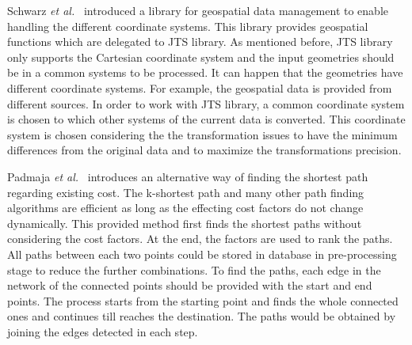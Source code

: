 \documentclass[a4paper,12pt]{article}
\begin{document}
Schwarz \emph{et al.}~\cite{Schwarz2004} introduced a library for geospatial data management to enable handling the different coordinate systems. This library provides geospatial functions which are delegated to JTS library. As mentioned before, JTS library only supports the Cartesian coordinate system and the input geometries should be in a common systems to be processed. It can happen that the geometries have different coordinate systems. For example, the geospatial data is provided from different sources. In order to work with JTS library, a common coordinate system is chosen to which other systems of the current data is converted. This coordinate system is chosen considering the the transformation issues to have the minimum differences from the original data and to maximize the transformations precision.


Padmaja \emph{et al.}~\cite{short-path} introduces an alternative way of finding the shortest path regarding existing cost. The k-shortest path and many other path finding algorithms are efficient as long as the effecting cost factors do not change dynamically. This provided method first finds the shortest paths without considering the cost factors. At the end, the factors are used to rank the paths. All paths between each two points could be stored in database in pre-processing stage to reduce the further combinations. To find the paths, each edge in the network of the connected points should be provided with the start and end points. The process starts from the starting point and finds the whole connected ones and continues till reaches the destination. The paths would be obtained by joining the edges detected in each step.
















\newpage
\end{document}
